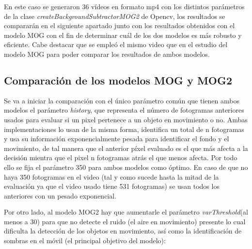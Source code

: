 \documentclass[a4paper,12pt]{article}
\begin{document}
{\vspace{0.5cm}

En este caso se generaron 36 vídeos en formato mp4 con los distintos parámetros de la clase \textit{createBackgroundSubtractorMOG2} de Opencv, los resultados se compararán en el siguiente apartado
junto con los resultados obtenidos con el modelo MOG con el fin de determinar cuál de los dos modelos es más robusto y eficiente. Cabe destacar que se empleó el mismo video que en el 
estudio del modelo MOG para poder comparar los resultados de ambos modelos.

\vspace{0.5cm}

\subsection{Comparación de los modelos MOG y MOG2}

\vspace{0.5cm}

Se va a iniciar la comparación con el único parámetro común que tienen ambos modelos el parámetro \textit{history}, que representa el número de fotogramas anteriores usados para evaluar si un pixel pertenece a un objeto en movimiento o no.
Ambas implementaciones lo usan de la misma forma, identifica un total de n fotogramas y usa su información exponencialmente pesada para identificar el fondo y el movimiento, de tal manera que el anterior píxel evaluado es el que más afecta a 
la decisión mientra que el pixel n fotogramas atrás el que menos afecta. Por todo ello se fija el parámetro 350 para ambos modelos como óptimo. En caso de que no haya 350 fotogramas en el video (tal y como sucede hasta la mitad de la evaluación
ya que el video usado tiene 531 fotogramas) se usan todos los anteriores con un pesado exponencial.

\vspace{0.5cm}

Por otro lado, al modelo MOG2 hay que aumentarle el parámetro \textit{varThreshold}(al menos a 30) para que no detecte el ruido (el aire en movimiento) presente
lo cual dificulta la detección de los objetos en movimiento, así como la identificación de sombras en el móvil (el principal objetivo del modelo):

\vspace{0.5cm}

}
\end{document}
